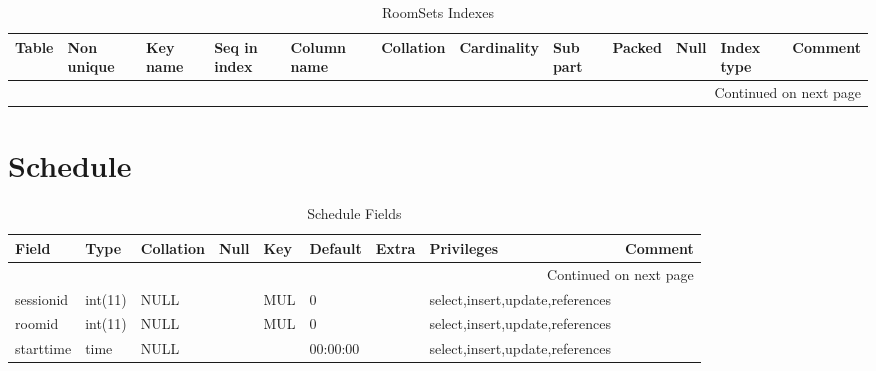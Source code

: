 \documentclass[tablesignature,landscape]{scrartcl}
\begin{document}
\begin{longtable}{|l|l|l|l|l|l|l|l|l|l|l|l|}
\caption{RoomSets Indexes} \label{tbl:roomsetsindexes}\\
\hline
 Table     &  Non unique  &  Key name  &  Seq in index  &  Column name  &  Collation  &  Cardinality  &  Sub part  &  Packed  &  Null  &  Index type  &  Comment \\
\hline
\endhead
\hline\multicolumn{12}{r}{Continued on next page}\
\endfoot
\endlastfoot
\hline
 RoomSets  &           0  &  PRIMARY   &             1  &  roomsetid    &  A          &           12  &  (NULL)    &  (NULL)  &        &  BTREE       &           \\
\hline
\end{longtable}
\section{Schedule}
\label{sec-24}


\begin{longtable}{|l|l|l|l|l|l|l|l|l|}
\caption{Schedule Fields} \label{tbl:schedulefields}\\
\hline
 Field       &  Type     &  Collation  &  Null  &  Key  &   Default  &  Extra              &  Privileges                       &  Comment \\
\hline
\endhead
\hline\multicolumn{9}{r}{Continued on next page}\
\endfoot
\endlastfoot
\hline
 scheduleid  &  int(11)  &  NULL       &        &  PRI  &    (NULL)  &  auto\_{}increment  &  select,insert,update,references  &           \\
 sessionid   &  int(11)  &  NULL       &        &  MUL  &         0  &                     &  select,insert,update,references  &           \\
 roomid      &  int(11)  &  NULL       &        &  MUL  &         0  &                     &  select,insert,update,references  &           \\
 starttime   &  time     &  NULL       &        &       &  00:00:00  &                     &  select,insert,update,references  &           \\
\hline
\end{longtable}
\end{document}
